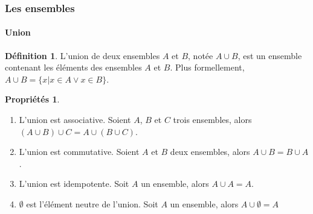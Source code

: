 \documentclass[10pt,notheorems]{beamer}
\theoremstyle{plain}
\theoremstyle{definition} %
\newtheorem{definition}{Définition}
\newtheorem{properties}{Propriétés}
\begin{document}


\begin{frame}
  \frametitle{Les ensembles}
  \framesubtitle{Union}
  \hypertarget{slide_ensembles_union}{}

  \begin{definition}\label{def:union} L'union de deux ensembles $A$ et $B$, notée $A\cup B$, est un ensemble contenant les éléments des ensembles $A$ et $B$. Plus formellement, $A \cup B = \{x | x \in A \lor x\in B\}$.
  \end{definition}

  \bigskip

  \begin{properties}\label{properties:union}
    \begin{enumerate}
    \item L'union est associative. Soient $A$, $B$ et $C$ trois ensembles, alors $(A\cup B)\cup C = A\cup (B\cup C)$.
    \item L'union est commutative. Soient $A$ et $B$ deux ensembles, alors $A \cup B = B \cup A$.
    \item L'union est idempotente. Soit $A$ un ensemble, alors $A\cup A = A$.
    \item $\emptyset$ est l'élément neutre de l'union. Soit $A$ un ensemble, alors $A\cup\emptyset=A$
    \end{enumerate}
  \end{properties}

\end{frame}
\end{document}

